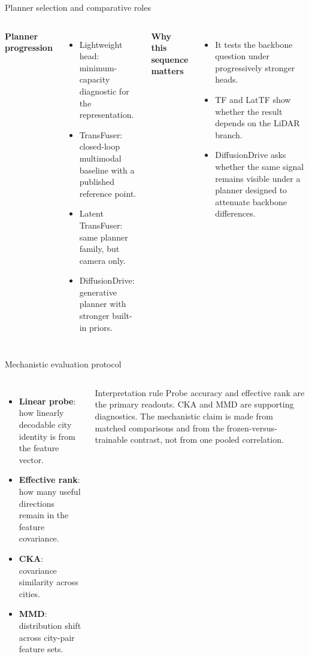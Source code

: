 \documentclass[aspectratio=169, xcolor={table}]{beamer}
\begin{document}
\begin{frame}{Planner selection and comparative roles}
  \begin{columns}[T]
    \textbf{Planner progression}
    \begin{itemize}\footnotesize
      \item Lightweight head: minimum-capacity diagnostic for the representation.
      \item TransFuser: closed-loop multimodal baseline with a published reference point.
      \item Latent TransFuser: same planner family, but camera only.
      \item DiffusionDrive: generative planner with stronger built-in priors.
    \end{itemize}
    \textbf{Why this sequence matters}
    \begin{itemize}\footnotesize
      \item It tests the backbone question under progressively stronger heads.
      \item TF and LatTF show whether the result depends on the LiDAR branch.
      \item DiffusionDrive asks whether the same signal remains visible under a planner designed to attenuate backbone differences.
    \end{itemize}
  \end{columns}
\end{frame}

\begin{frame}{Mechanistic evaluation protocol}
  \begin{columns}[T]
    \begin{itemize}\footnotesize
      \item \textbf{Linear probe}: how linearly decodable city identity is from the feature vector.
      \item \textbf{Effective rank}: how many useful directions remain in the feature covariance.
      \item \textbf{CKA}: covariance similarity across cities.
      \item \textbf{MMD}: distribution shift across city-pair feature sets.
    \end{itemize}
    \begin{block}{Interpretation rule}
      \footnotesize Probe accuracy and effective rank are the primary readouts. CKA and MMD are supporting diagnostics. The mechanistic claim is made from matched comparisons and from the frozen-versus-trainable contrast, not from one pooled correlation.
    \end{block}
  \end{columns}
\end{frame}
\end{document}
